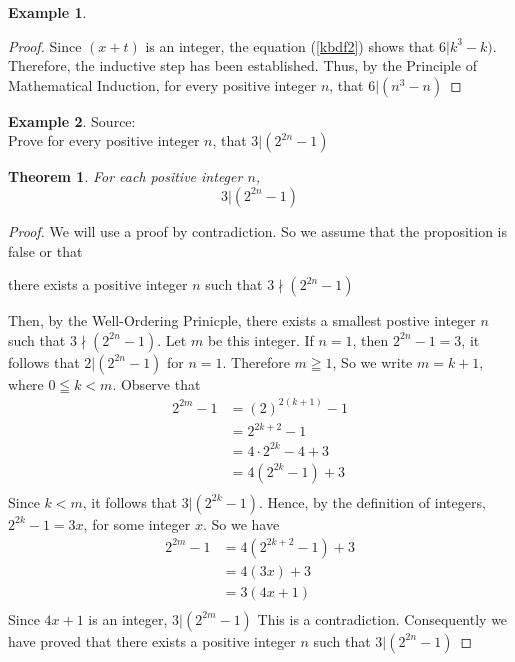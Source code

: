 \documentclass{book}
\newtheorem{theorem}{Theorem}[section]
\theoremstyle{definition}
\newtheorem{example}{Example}[definition]
\theoremstyle{remark}
\newcommand{\m}{\cdot}
\begin{document}
\begin{example}
\begin{proof}
    
    Since $(x+t)$ is an integer, the equation (\ref{kbdf2}) shows that $6 | k^3 - k)$. Therefore, the inductive step has been established. Thus, by the Principle of Mathematical Induction, for every positive integer $n$, that $6 | (n^3 - n)$
 
\end{proof}
\end{example}




\newpage
\begin{example}
Source: \cite[Chap.6, S.6.3, Result 6.17]{gray} \\ 

Prove for every positive integer $n$, that $3 | (2^{2n} - 1)$
    \begin{tcolorbox}
        \begin{theorem}
            For each positive integer $n$,
                \begin{equation*}
                    3 | (2^{2n} - 1)
                \end{equation*}
        \end{theorem}
    \end{tcolorbox}

    \begin{proof}
        We will use a proof by contradiction. So we assume that the proposition is false or that 
        
        	\begin{center}
        		there exists a positive integer $n$ such that $3 \nmid (2^{2n} - 1)$
        	\end{center}
        
        Then, by the Well-Ordering Prinicple, there exists a smallest postive integer $n$ such that $3 \nmid (2^{2n} - 1)$. Let $m$ be this integer. If $n=1$, then $2^{2n}-1 = 3$, it follows that $2 | (2^{2n} - 1)$ for $n=1$. Therefore $m \geqq 1$, So we write $m = k + 1$, where $0 \leqq k < m$. Observe that 
            \begin{align*}
                2^{2m} - 1 & = (2)^{2(k+1)} - 1 \\
                    & = 2^{2k + 2} - 1 \\
                    & = 4 \m 2^{2k} - 4 + 3 \\
                    & = 4(2^{2k} - 1) + 3 \\
            \end{align*}
        Since $k<m$, it follows that $ 3 | (2^{2k} - 1)$. Hence, by the definition of integers, $2^{2k} - 1 = 3x$, for some integer $x$. So we have
            \begin{align*}
                2^{2m} - 1 & = 4(2^{2k + 2} - 1) + 3 \\
                    & = 4(3x) + 3 \\
                    & = 3 (4x + 1) \\
            \end{align*}
        Since $4x + 1$ is an integer, $3 | (2^{2m} - 1)$ This is a contradiction. Consequently we have proved that there exists a positive integer $n$ such that $3 | (2^{2n} - 1)$
    \end{proof}
\end{example}
\end{document}
